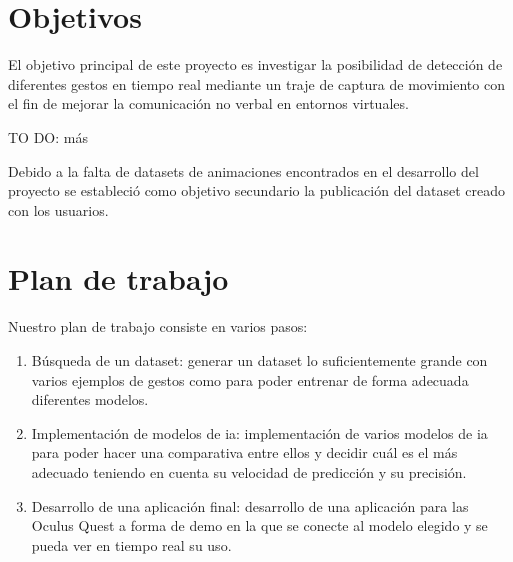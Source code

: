 \section{Objetivos}
El objetivo principal de este proyecto es investigar la posibilidad de detección de diferentes gestos en tiempo real mediante un traje de captura de movimiento con el fin de mejorar la comunicación no verbal en entornos virtuales.

TO DO: más

Debido a la falta de datasets de animaciones encontrados en el desarrollo del proyecto se estableció como objetivo secundario la publicación del dataset creado con los usuarios.

\section{Plan de trabajo}
Nuestro plan de trabajo consiste en varios pasos:
\begin{enumerate}
	\item Búsqueda de un dataset: generar un dataset lo suficientemente grande con varios ejemplos de gestos como para poder entrenar de forma adecuada diferentes modelos.
	\item Implementación de modelos de \gls{ia}: implementación de varios modelos de \gls{ia} para poder hacer una comparativa entre ellos y decidir cuál es el más adecuado teniendo en cuenta su velocidad de predicción y su precisión.
	\item Desarrollo de una aplicación final: desarrollo de una aplicación para las Oculus Quest a forma de demo en la que se conecte al modelo elegido y se pueda ver en tiempo real su uso.
\end{enumerate}